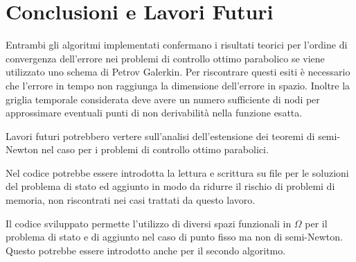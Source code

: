 \section{Conclusioni e Lavori Futuri}
\label{chap:Conclusion}
Entrambi gli algoritmi implementati confermano i risultati teorici per l'ordine di convergenza dell'errore nei problemi di controllo ottimo parabolico se viene utilizzato uno schema di Petrov Galerkin. Per riscontrare questi esiti è necessario che l'errore in tempo non raggiunga la dimensione dell'errore in spazio. Inoltre la griglia temporale considerata deve avere un numero sufficiente di nodi per approssimare eventuali punti di non derivabilità nella funzione esatta.
\par
Lavori futuri potrebbero vertere sull'analisi dell'estensione dei teoremi di semi-Newton nel caso per i problemi di controllo ottimo parabolici. 
\par
Nel codice potrebbe essere introdotta la lettura e scrittura su file per le soluzioni del problema di stato ed aggiunto in modo da ridurre il rischio di problemi di memoria, non riscontrati nei casi trattati da questo lavoro. 
\par
Il codice sviluppato permette l'utilizzo di diversi spazi funzionali in $\Omega$ per il problema di stato e di aggiunto nel caso di punto fisso ma non di semi-Newton. Questo potrebbe essere introdotto anche per il secondo algoritmo.